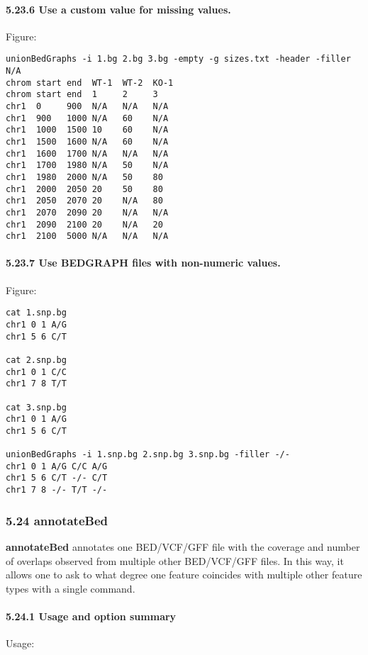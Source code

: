 \documentclass[letterpaper,10pt,english]{sphinxmanual}
\begin{document}
\paragraph{5.23.6 Use a custom value for missing values.}
\label{content/unionBedGraphs:use-a-custom-value-for-missing-values}
Figure:

\begin{Verbatim}[commandchars=\\\{\}]
unionBedGraphs -i 1.bg 2.bg 3.bg -empty -g sizes.txt -header -filler N/A
chrom start end  WT-1  WT-2  KO-1
chrom start end  1     2     3
chr1  0     900  N/A   N/A   N/A
chr1  900   1000 N/A   60    N/A
chr1  1000  1500 10    60    N/A
chr1  1500  1600 N/A   60    N/A
chr1  1600  1700 N/A   N/A   N/A
chr1  1700  1980 N/A   50    N/A
chr1  1980  2000 N/A   50    80
chr1  2000  2050 20    50    80
chr1  2050  2070 20    N/A   80
chr1  2070  2090 20    N/A   N/A
chr1  2090  2100 20    N/A   20
chr1  2100  5000 N/A   N/A   N/A
\end{Verbatim}


\paragraph{5.23.7 Use BEDGRAPH files with non-numeric values.}
\label{content/unionBedGraphs:use-bedgraph-files-with-non-numeric-values}
Figure:

\begin{Verbatim}[commandchars=\\\{\}]
cat 1.snp.bg
chr1 0 1 A/G
chr1 5 6 C/T

cat 2.snp.bg
chr1 0 1 C/C
chr1 7 8 T/T

cat 3.snp.bg
chr1 0 1 A/G
chr1 5 6 C/T

unionBedGraphs -i 1.snp.bg 2.snp.bg 3.snp.bg -filler -/-
chr1 0 1 A/G C/C A/G
chr1 5 6 C/T -/- C/T
chr1 7 8 -/- T/T -/-
\end{Verbatim}


\subsubsection{5.24 annotateBed}
\label{content/annotateBed::doc}\label{content/annotateBed:annotatebed}
\textbf{annotateBed} annotates one BED/VCF/GFF file with the coverage and number of overlaps observed
from multiple other BED/VCF/GFF files. In this way, it allows one to ask to what degree one feature
coincides with multiple other feature types with a single command.


\paragraph{5.24.1 Usage and option summary}
\label{content/annotateBed:usage-and-option-summary}
Usage:
\end{document}
